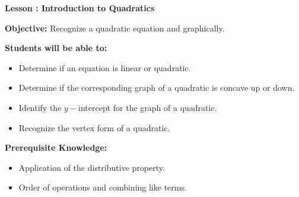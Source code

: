 \documentclass[12pt]{article}
\theoremstyle{definition}
\begin{document}
{\bf \large Lesson : Introduction to Quadratics}
\hfill \doclicenseImage[imagewidth=5em]\\
\par
{\bf Objective:} Recognize a quadratic equation and graphically.\\
\par
{\bf Students will be able to:}
\begin{itemize}
	\item Determine if an equation is linear or quadratic.
	\item Determine if the corresponding graph of a quadratic is concave up or down.
	\item Identify the $y-$intercept for the graph of a quadratic.
	\item Recognize the vertex form of a quadratic.
\end{itemize}
{\bf Prerequisite Knowledge:}
\begin{itemize}
	\item Application of the distributive property.
	\item Order of operations and combining like terms.
\end{itemize}
\hrulefill
\end{document}
